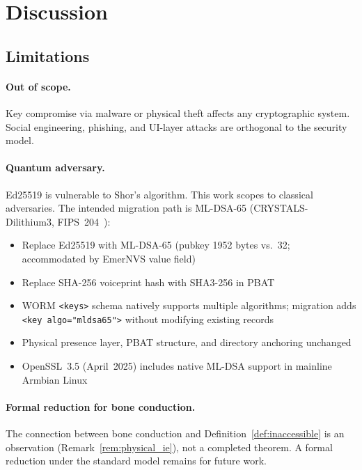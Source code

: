 \documentclass[11pt,a4paper]{article}
\theoremstyle{definition}
\newcommand{\PBAT}{\textsf{PBAT}}
\begin{document}
\section{Discussion}
\label{sec:discussion}

\subsection{Limitations}
\label{sec:limitations}

\paragraph{Out of scope.}
Key compromise via malware or physical theft affects any cryptographic
system. Social engineering, phishing, and UI-layer attacks are
orthogonal to the security model.

\paragraph{Quantum adversary.}
Ed25519 is vulnerable to Shor's algorithm. This work scopes to
classical adversaries. The intended migration path is ML-DSA-65
(CRYSTALS-Dilithium3, FIPS~204~\cite{FIPS204}):
\begin{itemize}
  \item Replace Ed25519 with ML-DSA-65 (pubkey 1952 bytes vs.\ 32;
        accommodated by EmerNVS value field)
  \item Replace SHA-256 voiceprint hash with SHA3-256 in \PBAT{}
  \item WORM \texttt{<keys>} schema natively supports multiple
        algorithms; migration adds \texttt{<key algo="mldsa65">}
        without modifying existing records
  \item Physical presence layer, \PBAT{} structure, and directory
        anchoring unchanged
  \item OpenSSL~3.5 (April~2025) includes native ML-DSA support
        in mainline Armbian Linux
\end{itemize}

\paragraph{Formal reduction for bone conduction.}
The connection between bone conduction and
Definition~\ref{def:inaccessible} is an observation
(Remark~\ref{rem:physical_ie}), not a completed theorem. A formal
reduction under the standard model remains for future work.
\end{document}
